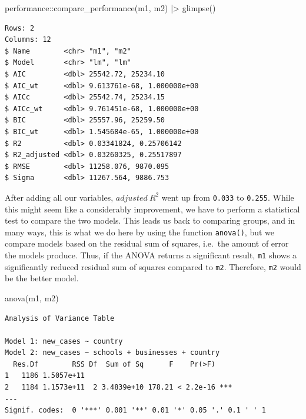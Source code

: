 \documentclass[
  letterpaper,
]{krantz}
\makeatletter
\newenvironment{Shaded}{\begin{snugshade}}{\end{snugshade}}
\newcommand{\FunctionTok}[1]{\textcolor[rgb]{0.28,0.35,0.67}{#1}}
\newcommand{\NormalTok}[1]{\textcolor[rgb]{0.00,0.23,0.31}{#1}}
\newcommand{\SpecialCharTok}[1]{\textcolor[rgb]{0.37,0.37,0.37}{#1}}
\newenvironment{kframe}{%
\medskip{}
\setlength{\fboxsep}{.8em}
 \def\at@end@of@kframe{}%
 \ifinner\ifhmode%
  \def\at@end@of@kframe{\end{minipage}}%
  \begin{minipage}{\columnwidth}%
 \fi\fi%
 \def\FrameCommand##1{\hskip\@totalleftmargin \hskip-\fboxsep
 \colorbox{shadecolor}{##1}\hskip-\fboxsep
     \hskip-\linewidth \hskip-\@totalleftmargin \hskip\columnwidth}%
 \MakeFramed {\advance\hsize-\width
   \@totalleftmargin\z@ \linewidth\hsize
   \@setminipage}}%
 {\par\unskip\endMakeFramed%
 \at@end@of@kframe}
\renewenvironment{Shaded}{\begin{kframe}}{\end{kframe}}
\makeatother
\begin{document}
\begin{Shaded}
\begin{Highlighting}[]
\NormalTok{performance}\SpecialCharTok{::}\FunctionTok{compare\_performance}\NormalTok{(m1, m2) }\SpecialCharTok{|\textgreater{}}
  \FunctionTok{glimpse}\NormalTok{()}
\end{Highlighting}
\end{Shaded}

\begin{verbatim}
Rows: 2
Columns: 12
$ Name        <chr> "m1", "m2"
$ Model       <chr> "lm", "lm"
$ AIC         <dbl> 25542.72, 25234.10
$ AIC_wt      <dbl> 9.613761e-68, 1.000000e+00
$ AICc        <dbl> 25542.74, 25234.15
$ AICc_wt     <dbl> 9.761451e-68, 1.000000e+00
$ BIC         <dbl> 25557.96, 25259.50
$ BIC_wt      <dbl> 1.545684e-65, 1.000000e+00
$ R2          <dbl> 0.03341824, 0.25706142
$ R2_adjusted <dbl> 0.03260325, 0.25517897
$ RMSE        <dbl> 11258.076, 9870.095
$ Sigma       <dbl> 11267.564, 9886.753
\end{verbatim}

After adding all our variables, \(adjusted\ R^2\) went up from
\texttt{0.033} to \texttt{0.255}. While this might seem like a
considerably improvement, we have to perform a statistical test to
compare the two models. This leads us back to comparing groups, and in
many ways, this is what we do here by using the function
\texttt{anova()}, but we compare models based on the residual sum of
squares, i.e.~the amount of error the models produce. Thus, if the ANOVA
returns a significant result, \texttt{m1} shows a significantly reduced
residual sum of squares compared to \texttt{m2}. Therefore, \texttt{m2}
would be the better model.

\begin{Shaded}
\begin{Highlighting}[]
\FunctionTok{anova}\NormalTok{(m1, m2)}
\end{Highlighting}
\end{Shaded}

\begin{verbatim}
Analysis of Variance Table

Model 1: new_cases ~ country
Model 2: new_cases ~ schools + businesses + country
  Res.Df        RSS Df  Sum of Sq      F    Pr(>F)    
1   1186 1.5057e+11                                   
2   1184 1.1573e+11  2 3.4839e+10 178.21 < 2.2e-16 ***
---
Signif. codes:  0 '***' 0.001 '**' 0.01 '*' 0.05 '.' 0.1 ' ' 1
\end{verbatim}
\end{document}
